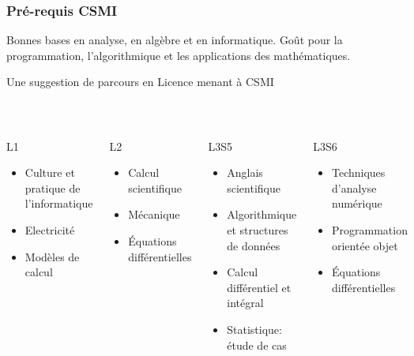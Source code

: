 \begin{frame}
  \frametitle{Pré-requis CSMI}
  \begin{block}{}
    Bonnes bases en analyse, en algèbre et en informatique. 
    Goût pour la programmation, l'algorithmique et les applications des mathématiques.
  \end{block}
  \centerline{Une suggestion de parcours en Licence menant à CSMI}\\[-3mm]
  
  \begin{columns}[t]
    \begin{block}{L1}
      \footnotesize\begin{itemize}
      \item Culture et pratique de l'informatique
      \item Electricité
      \item Modèles de calcul
      \end{itemize}
    \end{block}
    \begin{block}{L2}
      \footnotesize\begin{itemize}
      \item Calcul scientifique
      \item Mécanique
      \item Équations différentielles
      \end{itemize}
    \end{block}
    \begin{block}{L3S5}
      \footnotesize\begin{itemize}
       \item Anglais scientifique
       \item Algorithmique et structures de données 
       \item Calcul différentiel et intégral
       \item Statistique: étude de cas
       \end{itemize}
     \end{block}
     \begin{block}{L3S6}
       \footnotesize\begin{itemize}
       \item Techniques d'analyse numérique
       \item Programmation orientée objet
       \item Équations différentielles
      \end{itemize}
     \end{block}
  \end{columns}

\end{frame}

